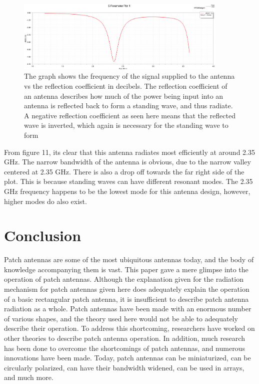 \documentclass[12pt]{article}
\begin{document}
\begin{figure}[h]
    \centering
    \includegraphics[width=0.9\textwidth]{basic-patch-antenna-splot.png}
    \caption{The graph shows the frequency of the signal supplied to the antenna vs the reflection coefficient in decibels. The reflection coefficient of an antenna describes how much of the power being input into an antenna is reflected back to form a standing wave, and thus radiate. A negative reflection coefficient as seen here means that the reflected wave is inverted, which again is necessary for the standing wave to form}
\end{figure}

From figure 11, its clear that this antenna radiates most efficiently at around 2.35 GHz. The narrow bandwidth of the antenna is obvious, due to the narrow valley centered at 2.35 GHz. There is also a drop off towards the far right side of the plot. This is because standing waves can have different resonant modes. The 2.35 GHz frequency happens to be the lowest mode for this antenna design, however, higher modes do also exist.

\section{Conclusion}

Patch antennas are some of the most ubiquitous antennas today, and the body of knowledge accompanying them is vast. This paper gave a mere glimpse into the operation of patch antennas. Although the explanation given for the radiation mechanism for patch antennas given here does adequately explain the operation of a basic rectangular patch antenna, it is insufficient to describe patch antenna radiation as a whole\cite{balanis2016antenna}. Patch antennas have been made with an enormous number of various shapes, and the theory used here would not be able to adequately describe their operation. To address this shortcoming, researchers have worked on other theories to describe patch antenna operation. In addition, much research has been done to overcome the shortcomings of patch antennas, and numerous innovations have been made\cite{balanis2016antenna}. Today, patch antennas can be miniaturized, can be circularly polarized, can have their bandwidth widened, can be used in arrays, and much more. 




\end{document}
